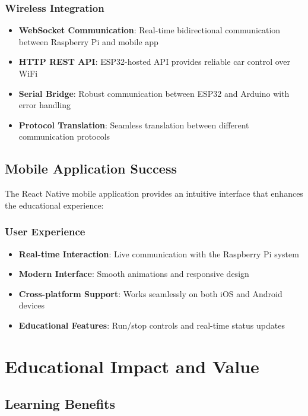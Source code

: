 \subsubsection{Wireless Integration}
\begin{itemize}
    \item \textbf{WebSocket Communication}: Real-time bidirectional communication between Raspberry Pi and mobile app
    \item \textbf{HTTP REST API}: ESP32-hosted API provides reliable car control over WiFi
    \item \textbf{Serial Bridge}: Robust communication between ESP32 and Arduino with error handling
    \item \textbf{Protocol Translation}: Seamless translation between different communication protocols
\end{itemize}

\subsection{Mobile Application Success}

The React Native mobile application provides an intuitive interface that enhances the educational experience:

\subsubsection{User Experience}
\begin{itemize}
    \item \textbf{Real-time Interaction}: Live communication with the Raspberry Pi system
    \item \textbf{Modern Interface}: Smooth animations and responsive design
    \item \textbf{Cross-platform Support}: Works seamlessly on both iOS and Android devices
    \item \textbf{Educational Features}: Run/stop controls and real-time status updates
\end{itemize}

\section{Educational Impact and Value}

\subsection{Learning Benefits}

